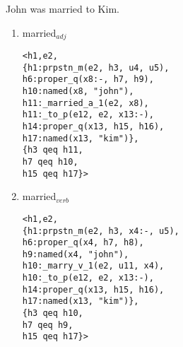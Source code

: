 \documentclass[landscape]{article}
\newcommand{\cfn}[2]{%
  \node [block] (#1) {#2};%
}
\begin{document}

\pagebreak

John was married to Kim.
\begin{enumerate}
\item married$_{adj}$
\begin{verbatim}
<h1,e2, 
{h1:prpstn_m(e2, h3, u4, u5), 
h6:proper_q(x8:-, h7, h9), 
h10:named(x8, "john"), 
h11:_married_a_1(e2, x8), 
h11:_to_p(e12, e2, x13:-), 
h14:proper_q(x13, h15, h16), 
h17:named(x13, "kim")}, 
{h3 qeq h11, 
h7 qeq h10, 
h15 qeq h17}> 
\end{verbatim}

\item married$_{verb}$
\begin{verbatim} 
<h1,e2, 
{h1:prpstn_m(e2, h3, x4:-, u5), 
h6:proper_q(x4, h7, h8), 
h9:named(x4, "john"), 
h10:_marry_v_1(e2, u11, x4), 
h10:_to_p(e12, e2, x13:-), 
h14:proper_q(x13, h15, h16), 
h17:named(x13, "kim")}, 
{h3 qeq h10, 
h7 qeq h9, 
h15 qeq h17}> 
\end{verbatim}
\end{enumerate}


\begin{tikzpicture}[node distance = 1.25in, auto]

\end{tikzpicture}

\pagebreak
\end{document}
